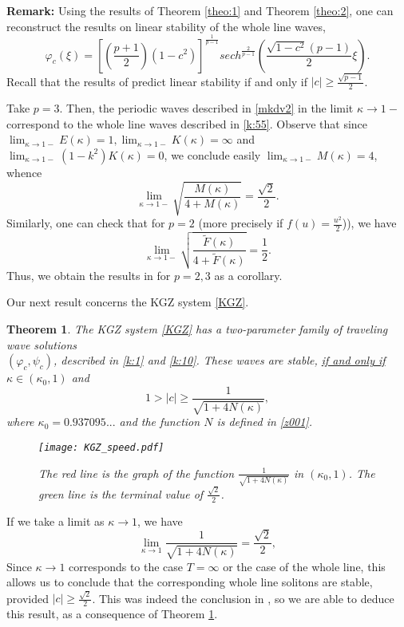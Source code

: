 \documentclass[final,11pt,leqno]{amsart}
\newtheorem{theorem}{Theorem}
\begin{document}
 {\bf Remark:} Using the results of Theorem \ref{theo:1} and Theorem \ref{theo:2},
 one can reconstruct the results on linear stability of the whole line
 waves, \cite{SS1}
 \begin{equation}
 \label{k:55}
{\varphi}_c(\xi)=\left[\left({\frac{{p+1}}{{2}}}\right) (1-c^2)  \right]^{{\frac{{1}}{{p-1}}}}
 sech^{{\frac{{2}}{{p-1}}}}\left({\frac{{\sqrt{1-c^2} (p-1)}}{{2}}} \xi\right).
\end{equation}
Recall that the results of \cite{SS1} predict linear stability if and only if $|c|\geq {\frac{{\sqrt{p-1}}}{{{2}}}}$.

Take $p=3$. Then, the periodic waves described in
\eqref{mkdv2} in the limit ${\kappa}\to 1-$ correspond to the whole line waves described in  \eqref{k:55}. Observe that since $\lim_{{\kappa}\to 1-} E({\kappa})=1,
\lim_{{\kappa}\to 1-} K({\kappa})=\infty$ and $\lim_{{\kappa}\to 1-} (1-k^2)K({\kappa})=0$, we conclude easily $\lim_{{\kappa}\to 1-} M({\kappa})=4$, whence
$$
\lim_{{\kappa}\to 1-} \sqrt{{\frac{{M({\kappa})}}{{4+M({\kappa})}}}}={\frac{{\sqrt{2}}}{{2}}}.
$$
Similarly, one can check that for $p=2$ (more precisely if $f(u)={\frac{{u^2}}{{2}}}$)),
 we have
 $$
\lim_{{\kappa}\to 1-} \sqrt{{\frac{{\tilde{F}({\kappa})}}{{4+\tilde{F}({\kappa})}}}}={\frac{{1}}{{2}}}.
$$
Thus, we obtain the results in \cite{SS1} for $p=2,3$ as a corollary.

Our next result concerns the KGZ system \eqref{KGZ}.
\begin{theorem}
\label{theo:10}
The KGZ system \eqref{KGZ} has a two-parameter family of traveling wave solutions \\  $({\varphi}_c, \psi_c)$, described in \eqref{k:1} and \eqref{k:10}.
  These waves are stable, \underline{if and only if} ${\kappa}\in ({\kappa}_0,1)$ and 
$$
1>|c|\geq {\frac{{1}}{{\sqrt{1+4 N({\kappa})}}}},  
$$
where ${\kappa}_0=0.937095...$ and the function $N$ is defined in \eqref{z001}.
\begin{figure}[h5]
\centering
\texttt{[image: KGZ\_speed.pdf]}
\caption{The red line is the graph of the function ${\frac{{1}}{{\sqrt{1+4 N({\kappa})}}}}$ in $({\kappa}_0,1)$. The green line is the terminal value of ${\frac{{\sqrt{2}}}{{2}}}$.}
\label{fig5}
\end{figure}
\end{theorem}
If we take a limit as ${\kappa}\to 1$, we have
$$
\lim_{{\kappa}\to 1} {\frac{{1}}{{\sqrt{1+4 N({\kappa})}}}}={\frac{{\sqrt{2}}}{{2}}},
$$
Since ${\kappa}\to 1$ corresponds to the case $T=\infty$ or the case of the whole line, this allows us to conclude that the corresponding whole line solitons are stable, provided $|c|\geq {\frac{{\sqrt{2}}}{{2}}}$. This was indeed the conclusion in \cite{SS1}, so we are able to deduce this result, as a consequence of Theorem \ref{theo:10}.
\end{document}
